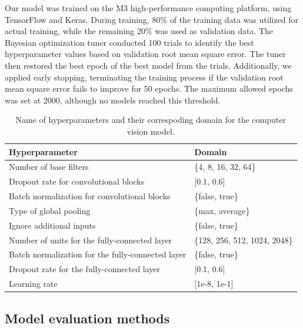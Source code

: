 \documentclass[]{interact}
\theoremstyle{plain}%
\theoremstyle{definition}
\theoremstyle{remark}
\begin{document}
Our model was trained on the M3 high-performance computing platform,
using TensorFlow and Keras. During training, 80\% of the training data
was utilized for actual training, while the remaining 20\% was used as
validation data. The Bayesian optimization tuner conducted 100 trials to
identify the best hyperparameter values based on validation root mean
square error. The tuner then restored the best epoch of the best model
from the trials. Additionally, we applied early stopping, terminating
the training process if the validation root mean square error fails to
improve for 50 epochs. The maximum allowed epochs was set at 2000,
although no models reached this threshold.

\begin{table}

\caption{\label{tab:hyperparameter}Name of hyperparameters and their correspoding domain for the computer vision model.}
\centering
\begin{tabular}[t]{ll}
\toprule
Hyperparameter & Domain\\
\midrule
Number of base filters & \{4, 8, 16, 32, 64\}\\
Dropout rate for convolutional blocks & {}[0.1, 0.6]\\
Batch normalization for convolutional blocks & \{false, true\}\\
Type of global pooling & \{max, average\}\\
Ignore additional inputs & \{false, true\}\\
\addlinespace
Number of units for the fully-connected layer & \{128, 256, 512, 1024, 2048\}\\
Batch normalization for the fully-connected layer & \{false, true\}\\
Dropout rate for the fully-connected layer & {}[0.1, 0.6]\\
Learning rate & {}[1e-8, 1e-1]\\
\bottomrule
\end{tabular}
\end{table}

\hypertarget{model-evaluation-methods}{%
\subsection{Model evaluation methods}\label{model-evaluation-methods}}
\end{document}
